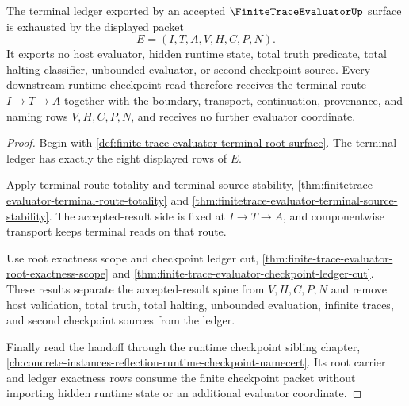 \begin{theorem}
\label{thm:finitetrace-evaluator-terminal-ledger-exhaustion}
The terminal ledger exported by an accepted $\FiniteTraceEvaluatorUp$ surface
is exhausted by the displayed packet
$$
E=(I,T,A,V,H,C,P,N).
$$
It exports no host evaluator, hidden runtime state, total truth predicate,
total halting classifier, unbounded evaluator, or second checkpoint source.
Every downstream runtime checkpoint read therefore receives the terminal
route $I \to T \to A$ together with the boundary, transport, continuation,
provenance, and naming rows $V,H,C,P,N$, and receives no further evaluator
coordinate.
\end{theorem}
\begin{proof}
Begin with \autoref{def:finite-trace-evaluator-terminal-root-surface}. The
terminal ledger has exactly the eight displayed rows of $E$.

Apply terminal route totality and terminal source stability,
\autoref{thm:finitetrace-evaluator-terminal-route-totality} and
\autoref{thm:finitetrace-evaluator-terminal-source-stability}. The
accepted-result side is fixed at $I \to T \to A$, and componentwise transport
keeps terminal reads on that route.

Use root exactness scope and checkpoint ledger cut,
\autoref{thm:finite-trace-evaluator-root-exactness-scope} and
\autoref{thm:finite-trace-evaluator-checkpoint-ledger-cut}. These results
separate the accepted-result spine from $V,H,C,P,N$ and remove host
validation, total truth, total halting, unbounded evaluation, infinite traces,
and second checkpoint sources from the ledger.

Finally read the handoff through the runtime checkpoint sibling chapter,
\autoref{ch:concrete-instances-reflection-runtime-checkpoint-namecert}. Its
root carrier and ledger exactness rows consume the finite checkpoint packet
without importing hidden runtime state or an additional evaluator coordinate.
\end{proof}
